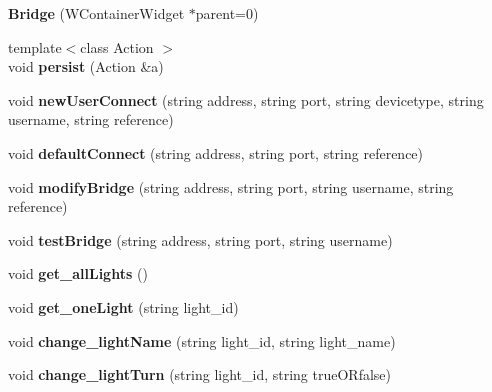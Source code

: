\begin{DoxyCompactItemize}
\item 
\mbox{\label{class_bridge_a01c40750ef65ff1d3e298ba9b6a84365}} 
{\bfseries Bridge} (W\+Container\+Widget $\ast$parent=0)
\item 
\mbox{\label{class_bridge_a20b4d278bc879a5c647e106e03fa1cdc}} 
{\footnotesize template$<$class Action $>$ }\\void {\bfseries persist} (Action \&a)
\item 
\mbox{\label{class_bridge_a08a06b026240f611629a51655939af28}} 
void {\bfseries new\+User\+Connect} (string address, string port, string devicetype, string username, string reference)
\item 
\mbox{\label{class_bridge_aed8f97f1934206c5de749598c77c535f}} 
void {\bfseries default\+Connect} (string address, string port, string reference)
\item 
\mbox{\label{class_bridge_a1378c7a7a02b7048d6d6b25d002fd37c}} 
void {\bfseries modify\+Bridge} (string address, string port, string username, string reference)
\item 
\mbox{\label{class_bridge_ac10faba92bde0ec0f9e5a249a8d50a36}} 
void {\bfseries test\+Bridge} (string address, string port, string username)
\item 
\mbox{\label{class_bridge_afacac6900e4bc45782fe0863817455d8}} 
void {\bfseries get\+\_\+all\+Lights} ()
\item 
\mbox{\label{class_bridge_a8754c9f194c997a1cfe5ed111ceddef1}} 
void {\bfseries get\+\_\+one\+Light} (string light\+\_\+id)
\item 
\mbox{\label{class_bridge_a9c44afd9c931325e73f03ba62b49c2e0}} 
void {\bfseries change\+\_\+light\+Name} (string light\+\_\+id, string light\+\_\+name)
\item 
\mbox{\label{class_bridge_a13c3c997050afad67371f3027c63a975}} 
void {\bfseries change\+\_\+light\+Turn} (string light\+\_\+id, string true\+O\+Rfalse)

\end{DoxyCompactItemize}
